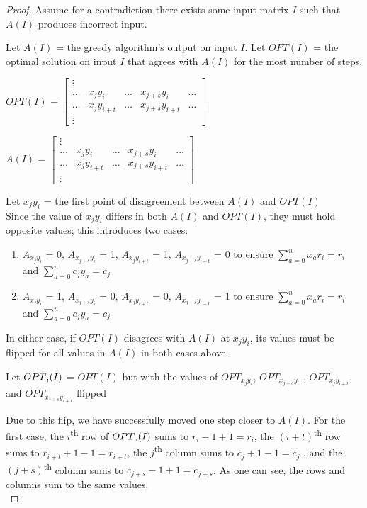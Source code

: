 \documentclass{article}
\begin{document}
	\begin{proof}
	Assume for a contradiction there exists some input matrix $I$ such that $A(I)$ produces incorrect input.
	
	Let $A(I)$ = the greedy algorithm's output on input $I$.
	Let $OPT(I)$ = the optimal solution on input $I$ that agrees
	with $A(I)$ for the most number of steps.
 	
	$OPT(I)$ = 
	$\begin{bmatrix}
		\vdots \\
		\dots & x_{j}y_{i} & \dots & x_{j+s}y_{i} & \dots \\
		\dots & x_{j}y_{i+t} & \dots & x_{j+s}y_{i+t} & \dots \\
		\vdots
	\end{bmatrix}$
	
	$A(I)$ = %
	$\begin{bmatrix}
		\vdots \\
		\dots & x_{j}y_{i} & \dots & x_{j+s}y_{i} & \dots \\
		\dots & x_{j}y_{i+t} & \dots & x_{j+s}y_{i+t} & \dots \\
		\vdots
	\end{bmatrix} $

	Let $x_jy_i$ = the first point of disagreement between $A(I)$ and $OPT(I)$\\
	Since the value of $x_jy_i$ differs in both $A(I)$ and $OPT(I)$, they must hold opposite values; this introduces two cases:
	\begin{enumerate}
		\item $A_{x_{j}y_{i}}$ = 0, $A_{x_{j+s}y_{i}}$ = 1, $A_{x_{j}y_{i+t}}$ = 1, $A_{x_{j+s}y_{i+t}}$ = 0 to ensure $\sum_{a=0}^{n} x_ar_i = r_i$ and $\sum_{a=0}^{n} c_jy_a = c_j$
		\item $A_{x_{j}y_{i}}$ = 1, $A_{x_{j+s}y_{i}}$ = 0, $A_{x_{j}y_{i+t}}$ = 0, $A_{x_{j+s}y_{i+t}}$ = 1 to ensure $\sum_{a=0}^{n} x_ar_i = r_i$ and $\sum_{a=0}^{n} c_jy_a = c_j$
	\end{enumerate}
	
	In either case, if $OPT(I)$ disagrees with $A(I)$ at $x_jy_i$, its values must be flipped for all values in $A(I)$ in both cases
	above.
	
	Let $OPT\textsc{\char13}(I)$ = $OPT(I)$ but with the values of $OPT_{x_jy_i}$, $OPT_{x_{j+s}y_i}$ , $OPT_{x_jy_{i+t}}$, and $OPT_{x_{j+s}y_{i+t}}$ flipped
		
	Due to this flip, we have successfully moved one step closer to $A(I)$. For the first case, the $i$\textsuperscript{th} row of $OPT\textsc{\char13}(I)$
	sums to $r_i - 1 + 1 = r_i$, the $(i + t)$\textsuperscript{th} row sums to $r_{i+t} + 1 - 1 = r_{i+t}$, the $j$\textsuperscript{th} column sums to $c_j + 1 - 1 = c_j$ , and the $(j + s)$\textsuperscript{th} column sums to $c_{j+s} - 1 + 1 = c_{j+s}$. As one can see, the rows and columns sum to the same values. \\
	

\end{proof}
\end{document}
